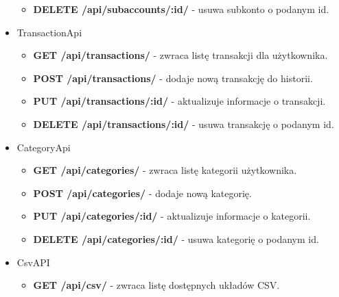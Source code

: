 \documentclass{article}
\begin{document}
\begin{itemize}
\begin{itemize}
				\item \textbf{DELETE /api/subaccounts/:id/} - usuwa subkonto o podanym id.
			\end{itemize}
		\item TransactionApi
			\begin{itemize}
				\item \textbf{GET /api/transactions/} - zwraca listę transakcji dla użytkownika.

				\item \textbf{POST /api/transactions/} - dodaje nową transakcję do historii.

				\item \textbf{PUT /api/transactions/:id/} - aktualizuje informacje o transakcji.

				\item \textbf{DELETE /api/transactions/:id/} - usuwa transakcję o podanym id.
			\end{itemize}




		\item CategoryApi
			\begin{itemize}
				\item \textbf{GET /api/categories/} - zwraca listę kategorii użytkownika.

				\item \textbf{POST /api/categories/} - dodaje nową kategorię.

				\item \textbf{PUT /api/categories/:id/} - aktualizuje informacje o kategorii.

				\item \textbf{DELETE /api/categories/:id/} - usuwa kategorię o podanym id.
			\end{itemize}
		\item CsvAPI
			\begin{itemize}
				\item \textbf{GET /api/csv/} - zwraca listę dostępnych układów CSV.


\end{itemize}
\end{itemize}
\end{document}
